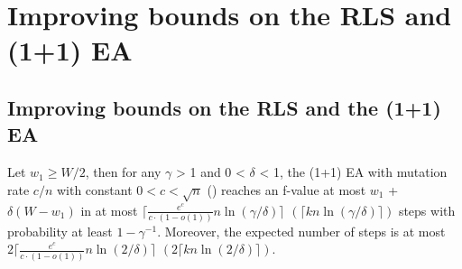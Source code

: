 \chapter{Improving bounds on the RLS and (1+1) EA}\label{ch:Content1}

\section{Improving bounds on the RLS and the (1+1) EA}

\begin{lemma}\label{lemma:CWittRefined}
    Let $w_1\ge W/2$, then for any $\gamma$ > 1 and 0 < $\delta$ < 1, the (1+1) EA with mutation rate $c/n$ with constant $0<c<\sqrt{n}$ (\RLSR[k]) reaches an f-value at most $w_1$ + $\delta(W-w_1)$ in at most $\lceil\frac{e^c}{c\cdot(1-o(1))}n\ln(\gamma/\delta)\rceil$ $(\lceil kn\ln(\gamma/\delta)\rceil)$ steps with probability at least $1-\gamma^{-1}$. Moreover, the expected number of steps is at most $2\lceil\frac{e^c}{c\cdot(1-o(1))}n\ln(2/\delta)\rceil$ $(2\lceil kn\ln(2/\delta)\rceil)$.
\end{lemma}
